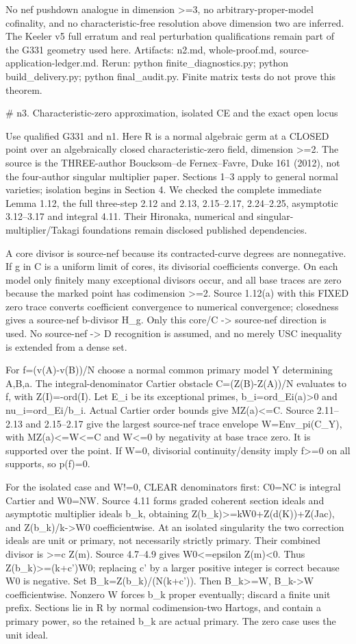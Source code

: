 \documentclass[11pt]{article}
\begin{document}
No nef pushdown analogue in dimension >=3, no arbitrary-proper-model cofinality, and no characteristic-free resolution above dimension two are inferred. The Keeler v5 full erratum and real perturbation qualifications remain part of the G331 geometry used here. Artifacts: n2.md, whole-proof.md, source-application-ledger.md. Rerun: python finite\_diagnostics.py; python build\_delivery.py; python final\_audit.py. Finite matrix tests do not prove this theorem.

 \# n3. Characteristic-zero approximation, isolated CE and the exact open locus

Use qualified G331 and n1. Here R is a normal algebraic germ at a CLOSED point over an algebraically closed characteristic-zero field, dimension >=2. The source is the THREE-author Boucksom--de Fernex--Favre, Duke 161 (2012), not the four-author singular multiplier paper. Sections 1--3 apply to general normal varieties; isolation begins in Section 4. We checked the complete immediate Lemma 1.12, the full three-step 2.12 and 2.13, 2.15--2.17, 2.24--2.25, asymptotic 3.12--3.17 and integral 4.11. Their Hironaka, numerical and singular-multiplier/Takagi foundations remain disclosed published dependencies.

A core divisor is source-nef because its contracted-curve degrees are nonnegative. If g in C is a uniform limit of cores, its divisorial coefficients converge. On each model only finitely many exceptional divisors occur, and all base traces are zero because the marked point has codimension >=2. Source 1.12(a) with this FIXED zero trace converts coefficient convergence to numerical convergence; closedness gives a source-nef b-divisor H\_g. Only this core/C -> source-nef direction is used. No source-nef -> D recognition is assumed, and no merely USC inequality is extended from a dense set.

For f=(v(A)-v(B))/N choose a normal common primary model Y determining A,B,a. The integral-denominator Cartier obstacle C=(Z(B)-Z(A))/N evaluates to f, with Z(I)=-ord(I). Let E\_i be its exceptional primes, b\_i=ord\_Ei(a)>0 and nu\_i=ord\_Ei/b\_i. Actual Cartier order bounds give MZ(a)<=C. Source 2.11--2.13 and 2.15--2.17 give the largest source-nef trace envelope W=Env\_pi(C\_Y), with MZ(a)<=W<=C and W<=0 by negativity at base trace zero. It is supported over the point. If W=0, divisorial continuity/density imply f>=0 on all supports, so p(f)=0.

For the isolated case and W!=0, CLEAR denominators first: C0=NC is integral Cartier and W0=NW. Source 4.11 forms graded coherent section ideals and asymptotic multiplier ideals b\_k, obtaining Z(b\_k)>=kW0+Z(d(K))+Z(Jac), and Z(b\_k)/k->W0 coefficientwise. At an isolated singularity the two correction ideals are unit or primary, not necessarily strictly primary. Their combined divisor is >=c Z(m). Source 4.7--4.9 gives W0<=epsilon Z(m)<0. Thus Z(b\_k)>=(k+c')W0; replacing c' by a larger positive integer is correct because W0 is negative. Set B\_k=Z(b\_k)/(N(k+c')). Then B\_k>=W, B\_k->W coefficientwise. Nonzero W forces b\_k proper eventually; discard a finite unit prefix. Sections lie in R by normal codimension-two Hartogs, and contain a primary power, so the retained b\_k are actual primary. The zero case uses the unit ideal.
\end{document}
